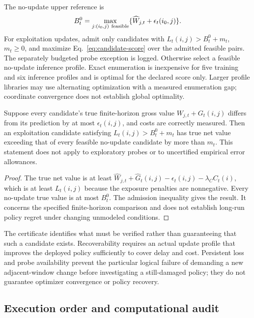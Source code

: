 The no-update upper reference is
\begin{equation}
 B_t^0=\max_{j:(i_0,j)\ \rm feasible}
       \{\widehat W_{j,t}+\epsilon_t(i_0,j)\}.
\end{equation}
For exploitation updates, admit only candidates with
$L_t(i,j)>B_t^0+m_t$, $m_t\ge0$, and maximize Eq.~\eqref{eq:candidate-score}
over the admitted feasible pairs. The separately budgeted probe exception is
logged. Otherwise select a feasible no-update inference profile. Exact
enumeration is inexpensive for five training and six inference profiles and
is optimal for the declared score only. Larger profile libraries may use
alternating optimization with a measured enumeration gap; coordinate convergence
does not establish global optimality.

\begin{proposition}
\label{prop:recovery-certificate}
Suppose every candidate's true finite-horizon gross value
$W_{j,t}+G_t(i,j)$ differs from its prediction by at most
$\epsilon_t(i,j)$, and costs are correctly measured. Then an exploitation
candidate satisfying $L_t(i,j)>B_t^0+m_t$ has true net value exceeding that
of every feasible no-update candidate by more than $m_t$. This statement does
not apply to exploratory probes or to uncertified empirical error allowances.
\end{proposition}
\begin{proof}
The true net value is at least
$\widehat W_{j,t}+\widehat G_t(i,j)-\epsilon_t(i,j)-\lambda_C C_t(i)$,
which is at least $L_t(i,j)$ because the exposure penalties are nonnegative.
Every no-update true value is at most $B_t^0$. The admission inequality gives
the result. It concerns the specified finite-horizon comparison and does not
establish long-run policy regret under changing unmodeled conditions.
\end{proof}

The certificate identifies what must be verified rather than guaranteeing that
such a candidate exists. Recoverability requires an actual update profile that
improves the deployed policy sufficiently to cover delay and cost. Persistent
loss and probe availability prevent the particular logical failure of demanding
a new adjacent-window change before investigating a still-damaged policy;
they do not guarantee optimizer convergence or policy recovery.

\subsection{Execution order and computational audit}

